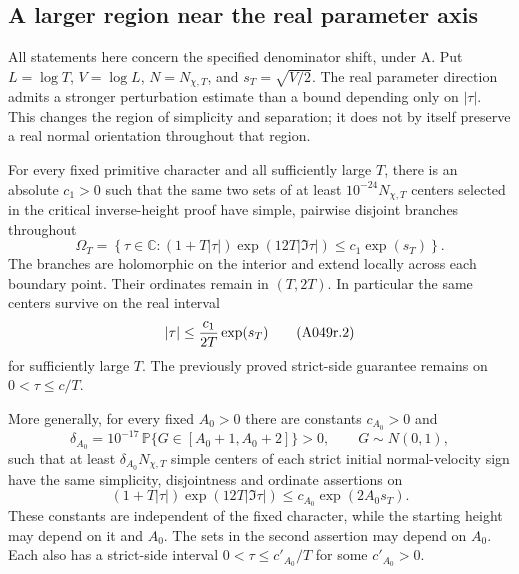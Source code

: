 \subsection*{A larger region near the real parameter axis}

All statements here concern the specified denominator shift, under A.
Put $L=\log T$, $V=\log L$, $N=N_{\chi,T}$,
and $s_T=\sqrt{V/2}$.
The real parameter direction admits a stronger perturbation estimate
than a bound depending only on $|\tau|$.  This changes the region
of simplicity and separation; it does not by itself preserve a real
normal orientation throughout that region.

\begin{theorem}
\label{thm:A049-anisotropic}
For every fixed primitive character and all sufficiently large $T$,
there is an absolute $c_1>0$ such that the same two sets of at least
$10^{-24}N_{\chi,T}$ centers selected in the critical inverse-height
proof have simple, pairwise disjoint branches throughout
\[
 \Omega_T=\left\{\tau\in\mathbb C:
       (1+T|\tau|)\exp(12T|\Im\tau|)
                      \le c_1\exp(s_T)\right\}.
\tag{A049r.1}
\]
The branches are holomorphic on the interior and extend locally
across each boundary point. Their ordinates remain in $(T,2T)$.
In particular the same centers survive on the real interval
\[
       |\tau|\le {c_1\over2T}\exp(s_T)
\tag{A049r.2}
\]
for sufficiently large $T$. The previously proved strict-side
guarantee remains on $0<\tau\le c/T$.

More generally, for every fixed $A_0>0$ there are constants
$c_{A_0}>0$ and
\[
 \delta_{A_0}=10^{-17}\,
       \mathbb P\{G\in[A_0+1,A_0+2]\}>0,
       \qquad G\sim N(0,1),
\tag{A049r.3}
\]
such that at least $\delta_{A_0}N_{\chi,T}$ simple centers of each
strict initial normal-velocity sign have the same simplicity,
disjointness and ordinate assertions on
\[
 (1+T|\tau|)\exp(12T|\Im\tau|)
                       \le c_{A_0}\exp(2A_0s_T).
\tag{A049r.4}
\]
These constants are independent of the fixed character, while the
starting height may depend on it and $A_0$. The sets in the second
assertion may depend on $A_0$. Each also has a strict-side interval
$0<\tau\le c'_{A_0}/T$ for some $c'_{A_0}>0$.
\end{theorem}

